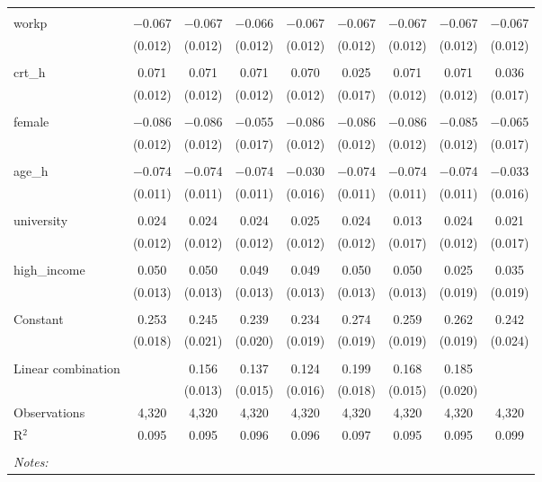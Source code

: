 \begin{table}[!htbp]
\begin{tabular}{@{\extracolsep{5pt}}lcccccccc}
  & & & & & & & & \\ 
 workp & $-$0.067 & $-$0.067 & $-$0.066 & $-$0.067 & $-$0.067 & $-$0.067 & $-$0.067 & $-$0.067 \\ 
  & (0.012) & (0.012) & (0.012) & (0.012) & (0.012) & (0.012) & (0.012) & (0.012) \\ 
  & & & & & & & & \\ 
 crt\_h & 0.071 & 0.071 & 0.071 & 0.070 & 0.025 & 0.071 & 0.071 & 0.036 \\ 
  & (0.012) & (0.012) & (0.012) & (0.012) & (0.017) & (0.012) & (0.012) & (0.017) \\ 
  & & & & & & & & \\ 
 female & $-$0.086 & $-$0.086 & $-$0.055 & $-$0.086 & $-$0.086 & $-$0.086 & $-$0.085 & $-$0.065 \\ 
  & (0.012) & (0.012) & (0.017) & (0.012) & (0.012) & (0.012) & (0.012) & (0.017) \\ 
  & & & & & & & & \\ 
 age\_h & $-$0.074 & $-$0.074 & $-$0.074 & $-$0.030 & $-$0.074 & $-$0.074 & $-$0.074 & $-$0.033 \\ 
  & (0.011) & (0.011) & (0.011) & (0.016) & (0.011) & (0.011) & (0.011) & (0.016) \\ 
  & & & & & & & & \\ 
 university & 0.024 & 0.024 & 0.024 & 0.025 & 0.024 & 0.013 & 0.024 & 0.021 \\ 
  & (0.012) & (0.012) & (0.012) & (0.012) & (0.012) & (0.017) & (0.012) & (0.017) \\ 
  & & & & & & & & \\ 
 high\_income & 0.050 & 0.050 & 0.049 & 0.049 & 0.050 & 0.050 & 0.025 & 0.035 \\ 
  & (0.013) & (0.013) & (0.013) & (0.013) & (0.013) & (0.013) & (0.019) & (0.019) \\ 
  & & & & & & & & \\ 
 Constant & 0.253 & 0.245 & 0.239 & 0.234 & 0.274 & 0.259 & 0.262 & 0.242 \\ 
  & (0.018) & (0.021) & (0.020) & (0.019) & (0.019) & (0.019) & (0.019) & (0.024) \\ 
  & & & & & & & & \\ 
Linear combination &   & 0.156 & 0.137 & 0.124 & 0.199 & 0.168 & 0.185 &  \\ 
 &  & (0.013) & (0.015) & (0.016) & (0.018) & (0.015) & (0.020) &  \\ 
Observations & 4,320 & 4,320 & 4,320 & 4,320 & 4,320 & 4,320 & 4,320 & 4,320 \\ 
R$^{2}$ & 0.095 & 0.095 & 0.096 & 0.096 & 0.097 & 0.095 & 0.095 & 0.099 \\ 
\hline \\[-1.8ex] 
\textit{Notes:} & \multicolumn{8}{l}{} \\ 
\end{tabular} 
\end{table} 
